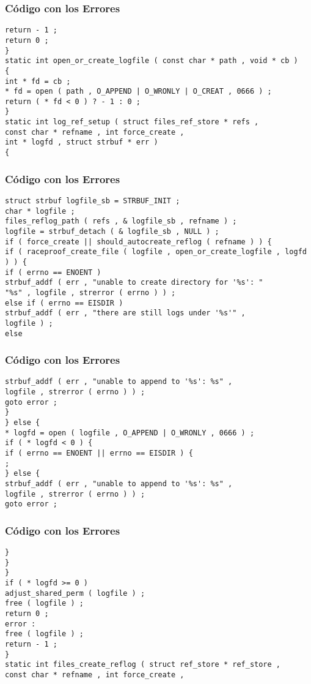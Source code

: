 \documentclass{beamer}
\begin{document}
\begin{frame}[fragile]
\frametitle{C\'odigo con los Errores}
\begin{verbatim}
return - 1 ; 
return 0 ; 
} 
static int open_or_create_logfile ( const char * path , void * cb ) 
{ 
int * fd = cb ; 
* fd = open ( path , O_APPEND | O_WRONLY | O_CREAT , 0666 ) ; 
return ( * fd < 0 ) ? - 1 : 0 ; 
} 
static int log_ref_setup ( struct files_ref_store * refs , 
const char * refname , int force_create , 
int * logfd , struct strbuf * err ) 
{ 
\end{verbatim}
\end{frame}
\begin{frame}[fragile]
\frametitle{C\'odigo con los Errores}
\begin{verbatim}
struct strbuf logfile_sb = STRBUF_INIT ; 
char * logfile ; 
files_reflog_path ( refs , & logfile_sb , refname ) ; 
logfile = strbuf_detach ( & logfile_sb , NULL ) ; 
if ( force_create || should_autocreate_reflog ( refname ) ) { 
if ( raceproof_create_file ( logfile , open_or_create_logfile , logfd ) ) { 
if ( errno == ENOENT ) 
strbuf_addf ( err , "unable to create directory for '%s': " 
"%s" , logfile , strerror ( errno ) ) ; 
else if ( errno == EISDIR ) 
strbuf_addf ( err , "there are still logs under '%s'" , 
logfile ) ; 
else 
\end{verbatim}
\end{frame}
\begin{frame}[fragile]
\frametitle{C\'odigo con los Errores}
\begin{verbatim}
strbuf_addf ( err , "unable to append to '%s': %s" , 
logfile , strerror ( errno ) ) ; 
goto error ; 
} 
} else { 
* logfd = open ( logfile , O_APPEND | O_WRONLY , 0666 ) ; 
if ( * logfd < 0 ) { 
if ( errno == ENOENT || errno == EISDIR ) { 
; 
} else { 
strbuf_addf ( err , "unable to append to '%s': %s" , 
logfile , strerror ( errno ) ) ; 
goto error ; 
\end{verbatim}
\end{frame}
\begin{frame}[fragile]
\frametitle{C\'odigo con los Errores}
\begin{verbatim}
} 
} 
} 
if ( * logfd >= 0 ) 
adjust_shared_perm ( logfile ) ; 
free ( logfile ) ; 
return 0 ; 
error : 
free ( logfile ) ; 
return - 1 ; 
} 
static int files_create_reflog ( struct ref_store * ref_store , 
const char * refname , int force_create , 
\end{verbatim}
\end{frame}
\end{document}
